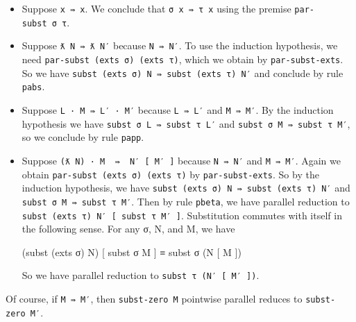 \begin{itemize}
\item
  Suppose \texttt{x\ ⇛\ x}. We conclude that \texttt{σ\ x\ ⇛\ τ\ x}
  using the premise \texttt{par-subst\ σ\ τ}.
\item
  Suppose \texttt{ƛ\ N\ ⇛\ ƛ\ N′} because \texttt{N\ ⇛\ N′}. To use the
  induction hypothesis, we need
  \texttt{par-subst\ (exts\ σ)\ (exts\ τ)}, which we obtain by
  \texttt{par-subst-exts}. So we have
  \texttt{subst\ (exts\ σ)\ N\ ⇛\ subst\ (exts\ τ)\ N′} and conclude by
  rule \texttt{pabs}.
\item
  Suppose \texttt{L\ ·\ M\ ⇛\ L′\ ·\ M′} because \texttt{L\ ⇛\ L′} and
  \texttt{M\ ⇛\ M′}. By the induction hypothesis we have
  \texttt{subst\ σ\ L\ ⇛\ subst\ τ\ L′} and
  \texttt{subst\ σ\ M\ ⇛\ subst\ τ\ M′}, so we conclude by rule
  \texttt{papp}.
\item
  Suppose \texttt{(ƛ\ N)\ ·\ M\ \ ⇛\ \ N′\ {[}\ M′\ {]}} because
  \texttt{N\ ⇛\ N′} and \texttt{M\ ⇛\ M′}. Again we obtain
  \texttt{par-subst\ (exts\ σ)\ (exts\ τ)} by \texttt{par-subst-exts}.
  So by the induction hypothesis, we have
  \texttt{subst\ (exts\ σ)\ N\ ⇛\ subst\ (exts\ τ)\ N′} and
  \texttt{subst\ σ\ M\ ⇛\ subst\ τ\ M′}. Then by rule \texttt{pbeta}, we
  have parallel reduction to
  \texttt{subst\ (exts\ τ)\ N′\ {[}\ subst\ τ\ M′\ {]}}. Substitution
  commutes with itself in the following sense. For any σ, N, and M, we
  have

  \begin{myDisplay}
    (subst (exts σ) N) [ subst σ M ] ≡ subst σ (N [ M ])
  \end{myDisplay}

  So we have parallel reduction to
  \texttt{subst\ τ\ (N′\ {[}\ M′\ {]})}.
\end{itemize}

Of course, if \texttt{M\ ⇛\ M′}, then \texttt{subst-zero\ M} pointwise
parallel reduces to \texttt{subst-zero\ M′}.

